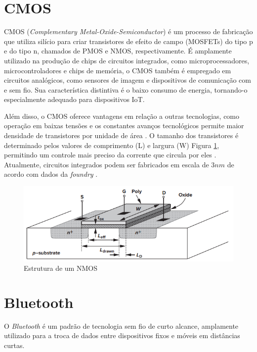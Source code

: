 \section{CMOS}
CMOS (\textit{Complementary Metal-Oxide-Semiconductor}) é um processo de fabricação que utiliza silício para criar transistores de efeito de campo (MOSFETs) do tipo p e do tipo n, chamados de PMOS e NMOS, respectivamente. É amplamente utilizado na produção de chips de circuitos integrados, como microprocessadores, microcontroladores e chips de memória, o CMOS também é empregado em circuitos analógicos, como sensores de imagem e dispositivos de comunicação com e sem fio. Sua característica distintiva é o baixo consumo de energia, tornando-o especialmente adequado para dispositivos IoT.

Além disso, o CMOS oferece vantagens em relação a outras tecnologias, como operação em baixas tensões e os constantes avanços tecnológicos permite maior densidade de transistores por unidade de área . O tamanho dos transistores é determinado pelos valores de comprimento (L) e largura (W) Figura \ref{fig:nmos_structure}, permitindo um controle mais preciso da corrente que circula por eles \cite{designcmosrazavi2016}. Atualmente, circuitos integrados podem ser fabricados em escala de $3nm$ de acordo com dados da \textit{foundry} \cite{tsmc}.

\begin{figure}[h!]
	\caption{Estrutura de um NMOS}
	\begin{center}
		\includegraphics[scale=0.6]{img/nmos_structure.png}
	\end{center}
	\label{fig:nmos_structure}
\end{figure}

\section{Bluetooth}
O \textit{Bluetooth} é um padrão de tecnologia sem fio de curto alcance, amplamente utilizado para a troca de dados entre dispositivos fixos e móveis em distâncias curtas. 

